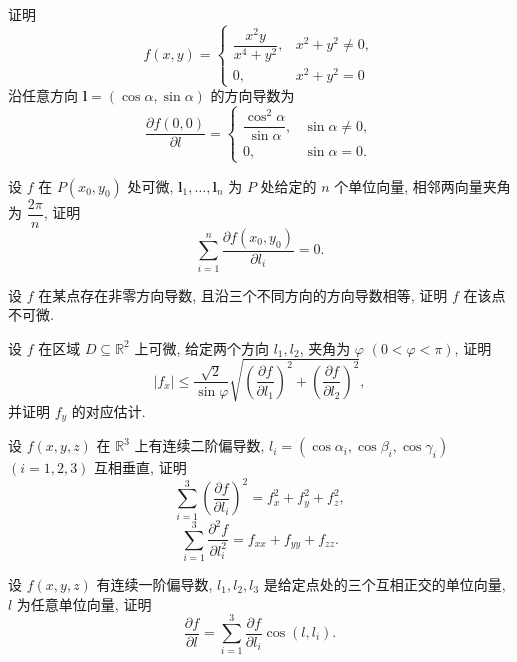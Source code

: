 \documentclass[../../数学分析培优讲义.tex]{subfiles}
\begin{document}
\begin{example}
证明
\[
    f(x,y)=
    \begin{cases}
        \dfrac{x^2y}{x^4+y^2}, & x^2+y^2\ne0,\\
        0, & x^2+y^2=0
    \end{cases}
\]
沿任意方向 $\bm l=(\cos\alpha,\sin\alpha)$ 的方向导数为
\[
    \dfrac{\partial f(0,0)}{\partial l}
    =\begin{cases}
        \dfrac{\cos^2\alpha}{\sin\alpha}, & \sin\alpha\ne0,\\
        0, & \sin\alpha=0.
    \end{cases}
\]
\end{example}
\exampleblank

\begin{example}
设 $f$ 在 $P(x_0,y_0)$ 处可微, $\bm l_1,\ldots,\bm l_n$ 为 $P$ 处给定的 $n$ 个单位向量, 相邻两向量夹角为 $\dfrac{2\pi}{n}$, 证明
\[
    \sum\limits_{i=1}^n\dfrac{\partial f(x_0,y_0)}{\partial l_i}=0.
\]
\end{example}
\exampleblank

\begin{example}
设 $f$ 在某点存在非零方向导数, 且沿三个不同方向的方向导数相等, 证明 $f$ 在该点不可微.
\end{example}
\exampleblank

\begin{example}
设 $f$ 在区域 $D\subseteq\mathbb{R}^2$ 上可微, 给定两个方向 $l_1,l_2$, 夹角为 $\varphi$ $(0<\varphi<\pi)$, 证明
\[
    |f_x|\leq\dfrac{\sqrt2}{\sin\varphi}
    \sqrt{\left(\dfrac{\partial f}{\partial l_1}\right)^2+
    \left(\dfrac{\partial f}{\partial l_2}\right)^2},
\]
并证明 $f_y$ 的对应估计.
\end{example}
\exampleblank

\begin{example}
设 $f(x,y,z)$ 在 $\mathbb{R}^3$ 上有连续二阶偏导数, $l_i=(\cos\alpha_i,\cos\beta_i,\cos\gamma_i)$ $(i=1,2,3)$ 互相垂直, 证明
\[
    \sum\limits_{i=1}^3\left(\dfrac{\partial f}{\partial l_i}\right)^2
    =f_x^2+f_y^2+f_z^2,
\]
\[
    \sum\limits_{i=1}^3\dfrac{\partial^2f}{\partial l_i^2}
    =f_{xx}+f_{yy}+f_{zz}.
\]
\end{example}
\exampleblank

\begin{example}[\markstar]
设 $f(x,y,z)$ 有连续一阶偏导数, $l_1,l_2,l_3$ 是给定点处的三个互相正交的单位向量, $l$ 为任意单位向量, 证明
\[
    \dfrac{\partial f}{\partial l}
    =\sum\limits_{i=1}^3\dfrac{\partial f}{\partial l_i}\cos(l,l_i).
\]
\end{example}
\exampleblank
\end{document}
